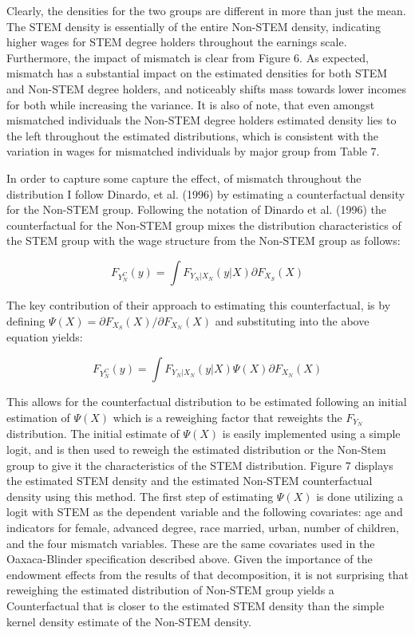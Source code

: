 \documentclass[11pt]{article}
\theoremstyle{definition}
\begin{document}
Clearly, the densities for the two groups are different in more than just the mean.  The STEM density is essentially of the entire Non-STEM density, indicating higher wages for STEM degree holders throughout the earnings scale.  Furthermore, the impact of mismatch is clear from Figure 6.  As expected, mismatch has a substantial impact on the estimated densities for both STEM and Non-STEM degree holders, and noticeably shifts mass towards lower incomes for both while increasing the variance.  It is also of note, that even amongst mismatched individuals the Non-STEM degree holders estimated density lies to the left throughout the estimated distributions, which is consistent with the variation in wages for mismatched individuals by major group from Table 7.  

In order to capture some capture the effect, of mismatch throughout the distribution I follow Dinardo, et al. (1996) by estimating a counterfactual density for the Non-STEM group.  Following the notation of Dinardo et al. (1996) the counterfactual for the Non-STEM group mixes the distribution characteristics of the STEM group with the wage structure from the Non-STEM group as follows:

\begin{equation*}
F_{Y_N^C}(y) = \int F_{Y_N|X_N}(y|X) \partial F_{X_S}(X)
\end{equation*}

The key contribution of their approach to estimating this counterfactual, is by defining $\Psi(X) = \partial F_{X_S}(X)/ \partial F_{X_N}(X)$ and substituting into the above equation yields:

\begin{equation*}
F_{Y_N^C}(y) = \int F_{Y_N|X_N}(y|X)\Psi(X) \partial F_{X_N}(X)
\end{equation*}

This allows for the counterfactual distribution to be estimated following an initial estimation of $\Psi(X)$ which is a reweighing factor that reweights the $F_{Y_N}$ distribution.  The initial estimate of $\Psi(X)$ is easily implemented using a simple logit, and is then used to reweigh the estimated distribution or the Non-Stem group to give it the characteristics of the STEM distribution.  Figure 7 displays the estimated STEM density and the estimated Non-STEM counterfactual density using this method.  The first step of estimating $\Psi(X)$ is done utilizing a logit with STEM as the dependent variable and the following covariates: age and indicators for female, advanced degree, race married, urban, number of children, and the four mismatch variables.  These are the same covariates used in the Oaxaca-Blinder specification described above.  Given the importance of the endowment effects from the  results of that decomposition, it is not surprising that reweighing the estimated distribution of Non-STEM group yields a Counterfactual that is closer to the estimated STEM density than the simple kernel density estimate of the Non-STEM density.  
\end{document}
